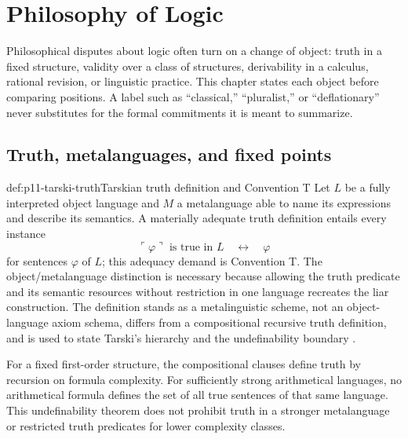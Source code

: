 \chapter{Philosophy of Logic}\label{sec:p11-philosophy-of-logic}

Philosophical disputes about logic often turn on a change of object: truth in a
fixed structure, validity over a class of structures, derivability in a
calculus, rational revision, or linguistic practice. This chapter states each
object before comparing positions. A label such as ``classical,'' ``pluralist,''
or ``deflationary'' never substitutes for the formal commitments it is meant
to summarize.

\section{Truth, metalanguages, and fixed points}
\label{sec:p11-truth}

\begin{hbdefinition}{def:p11-tarski-truth}{Tarskian truth definition and Convention T}
Let \(L\) be a fully interpreted object language and \(M\) a metalanguage able
to name its expressions and describe its semantics. A materially adequate
truth definition entails every instance
\[
 \ulcorner\varphi\urcorner\text{ is true in }L
 \quad\longleftrightarrow\quad
 \varphi
\]
for sentences \(\varphi\) of \(L\); this adequacy demand is Convention T. The
object/metalanguage distinction is necessary because allowing the truth
predicate and its semantic resources without restriction in one language
recreates the liar construction. The definition stands as a metalinguistic
scheme, not an object-language axiom schema, differs from a compositional
recursive truth definition, and is used to state Tarski's hierarchy and the
undefinability boundary \cite{Tarski1983,Halbach2011}.
\end{hbdefinition}

For a fixed first-order structure, the compositional clauses define truth by
recursion on formula complexity. For sufficiently strong arithmetical
languages, no arithmetical formula defines the set of all true sentences of
that same language. This undefinability theorem does not prohibit truth in a
stronger metalanguage or restricted truth predicates for lower complexity
classes.

